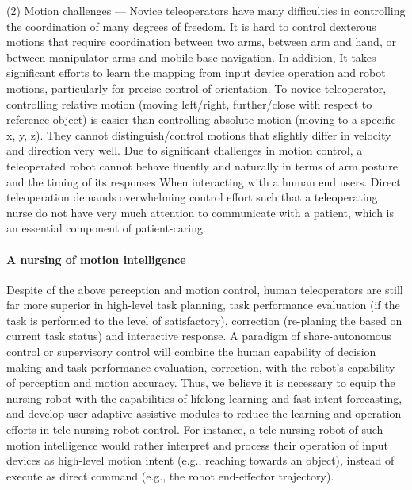 \documentclass[letterpaper, 11 pt, onecolumn]{article}
\begin{document}
\noindent(2) Motion challenges --- Novice teleoperators have many difficulties in controlling the coordination of many degrees of freedom. It is hard to control dexterous motions that require coordination between two arms, between arm and hand, or between manipulator arms and mobile base navigation. In addition, It takes significant efforts to learn the mapping from input device operation and robot motions, particularly for precise control of  orientation. To novice teleoperator, controlling relative motion (moving left/right, further/close with respect to reference object) is easier than controlling absolute motion (moving to a specific x, y, z). They cannot distinguish/control motions that slightly differ in velocity and direction very well. Due to significant challenges in motion control, a teleoperated robot cannot behave fluently and naturally in terms of arm posture and the timing of its responses When interacting with a human end users. Direct teleoperation demands overwhelming control effort such that a teleoperating nurse do not have very much attention to communicate with a patient, which is an essential component of patient-caring. 

\paragraph*{A nursing of motion intelligence} Despite of the above perception and motion control, human teleoperators are still far more superior in high-level task planning, task performance evaluation (if the task is performed to the level of satisfactory), correction (re-planing the based on current task status) and interactive response. A paradigm of share-autonomous control or supervisory control will combine the human capability of decision making and task performance evaluation, correction, with the robot's capability of perception and motion accuracy. Thus, we believe it is necessary to equip the nursing robot with the capabilities of lifelong learning and fast intent forecasting, and develop user-adaptive assistive modules to reduce the learning and operation efforts in tele-nursing robot control. For instance, a tele-nursing robot of such motion intelligence would rather interpret and process their operation of input devices as high-level motion intent (e.g., reaching towards an object), instead of execute as direct command (e.g., the robot end-effector trajectory). 


\end{document}
